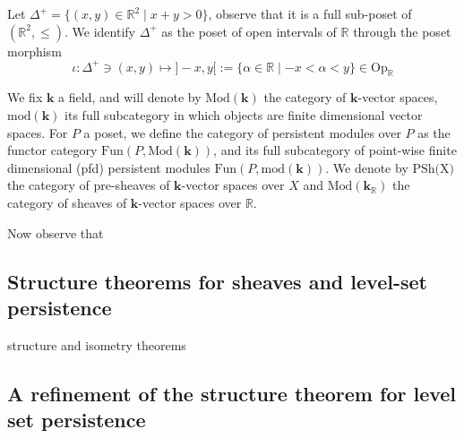 \documentclass[a4paper, english, 11pt]{article}
\newcommand{\kk}[0]{\textbf{k}}
\newcommand{\Mod}[0]{\text{Mod}}
\newcommand{\0}{\vec{0}}
\newcommand{\R}[0]{\mathbb{R}}
\newcommand{\Op}[0]{\text{Op}}
\begin{document}
Let $\Delta^+ = \{(x,y)\in \R^2 \mid  x + y > 0 \}$, observe that it is a full sub-poset of $(\R^2,\leq)$. We identify $\Delta^+$ as the poset of open intervals of $\R$ through the poset morphism $$\iota : \Delta^+ \ni (x,y) \mapsto ]-x,y[ := \{\alpha \in \R \mid -x < \alpha < y\} \in \Op_\R $$

We fix $\kk$ a field, and will denote by $\Mod (\kk)$ the category of $\kk$-vector spaces, $\text{mod}(\kk)$ its full subcategory in which objects are finite dimensional vector spaces. For $P$ a poset, we define the category of persistent modules over $P$ as the functor category $\text{Fun}(P,\Mod(\kk))$, and its full subcategory of point-wise finite dimensional (pfd) persistent modules $\text{Fun}(P,\text{mod}(\kk))$. We denote by $\text{PSh(X)}$ the category of pre-sheaves of $\kk$-vector spaces over $X$ and $\Mod(\kk_\R)$ the category of sheaves of $\kk$-vector spaces over $\R$.  

Now observe that 

\subsection{Structure theorems for sheaves and level-set persistence}

structure and isometry theorems

\subsection{A refinement of the structure theorem for level set persistence}
\end{document}
